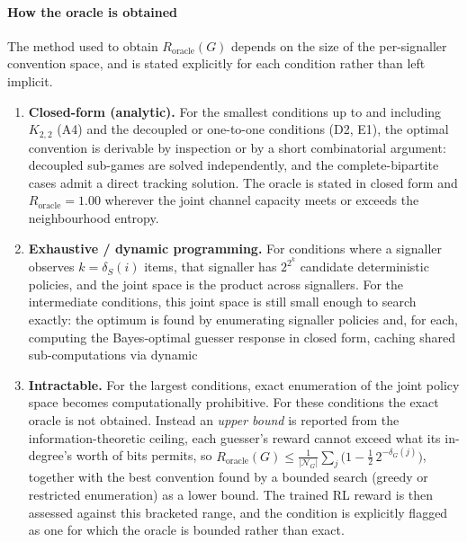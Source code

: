 \documentclass[a4paper,twoside,12pt]{report}
\begin{document}
    \paragraph{How the oracle is obtained}
    The method used to obtain $R_{\mathrm{oracle}}(G)$ depends on the size of
    the per-signaller convention space, and is stated explicitly for each
    condition rather than left implicit.
    
    \begin{enumerate}
        \item \textbf{Closed-form (analytic).} For the smallest conditions up to
        and including $K_{2,2}$ (A4) and the decoupled or one-to-one conditions
        (D2, E1), the optimal convention is derivable by inspection or by a short
        combinatorial argument: decoupled sub-games are solved independently, and
        the complete-bipartite cases admit a direct tracking solution. The oracle
        is stated in closed form and $R_{\mathrm{oracle}} = 1.00$ wherever the
        joint channel capacity meets or exceeds the neighbourhood entropy.
    
        \item \textbf{Exhaustive / dynamic programming.} For conditions where a
        signaller observes $k = \delta_S(i)$ items, that signaller has
        $2^{2^{k}}$ candidate deterministic policies, and the joint space is the
        product across signallers. For the intermediate conditions, this joint
        space is still small enough to search exactly: the optimum is found by
        enumerating signaller policies  and, for each, computing the Bayes-optimal guesser
        response in closed form, caching shared sub-computations via dynamic
    
        \item \textbf{Intractable.} For the largest
        conditions, exact enumeration of the joint
        policy space becomes computationally prohibitive. For these conditions
        the exact oracle is not obtained. Instead an \emph{upper bound} is reported
        from the information-theoretic ceiling, each guesser's reward cannot
        exceed what its in-degree's worth of bits permits, so
        $R_{\mathrm{oracle}}(G) \leq \tfrac{1}{|\mathcal{N}_G|}\sum_j
        \bigl(1 - \tfrac{1}{2}\,2^{-\delta_G(j)}\bigr)$, together with the best
        convention found by a bounded search (greedy or restricted enumeration)
        as a lower bound. The trained RL reward is then assessed against this
        bracketed range, and the condition is explicitly flagged as one for which
        the oracle is bounded rather than exact.
    \end{enumerate}
    
\end{document}
